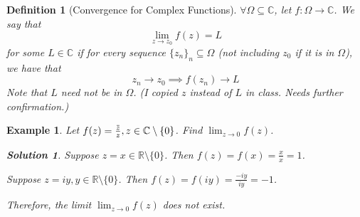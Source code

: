 \documentclass[11pt, oneside]{book}
\theoremstyle{break}
\newtheorem*{solution}{Solution}
\newtheorem{defn}{Definition}[section]
\newtheorem{eg}{Example}[section]
\renewcommand{\bar}[1]{\mkern 1.5mu \overline{\mkern -1.5mu #1 \mkern -1.5mu} \mkern 1.5mu}
\begin{document}
\begin{defn}[Convergence for Complex Functions]\label{defn:Convergence for Complex Functions}
	$\forall \Omega \subseteq \mathbb{C}$, let $f: \Omega \to \mathbb{C}$. We say that
	\begin{equation}
		\lim_{z \to z_0} f(z) = L
	\end{equation}
	for some $L \in \mathbb{C}$ if for every sequence $\{z_n\}_n \subseteq \Omega$ (not including $z_0$ if it is in $\Omega$), we have that
	\begin{equation}
		z_n \to z_0 \implies f(z_n) \to L
	\end{equation}
	Note that $L$ need not be in $\Omega$. (I copied $z$ instead of $L$ in class. Needs further confirmation.)
\end{defn}

\begin{eg}\label{eg:limit dne}
	Let $f(z) = \frac{\bar{z}}{z}, z \in \mathbb{C} \setminus \{0\}$. Find $\lim_{z \to 0} f(z)$.

	\begin{solution}
		Suppose $z = x \in \mathbb{R} \setminus \{0\}$. Then $f(z) = f(x) = \frac{x}{x} = 1$.

		Suppose $z = iy, y \in \mathbb{R} \setminus \{0\}$. Then $f(z) = f(iy) = \frac{-iy}{iy} = -1$.

		Therefore, the limit $\lim_{z \to 0} f(z)$ does not exist.
	\end{solution}
\end{eg}
\end{document}
